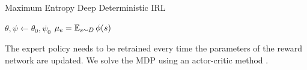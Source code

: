 \begin{algorithm}[tbhp]
	\caption{Maximum Entropy Deep Deterministic IRL}
	\label{deterministic-medirl}
	
	
	
	\BlankLine
	$\theta, \psi \gets \theta_0, \psi_0$ \DontPrintSemicolon {} 
	$\mu_e= \operatorname*{\mathbb{E}}_{s \sim D}{\phi(s)}$ \DontPrintSemicolon {}
	\BlankLine
	
\end{algorithm}

The expert policy needs to be retrained every time the parameters of the reward network are updated. We solve the MDP using an actor-critic method \cite{mnih_actor_critic_2016}.


